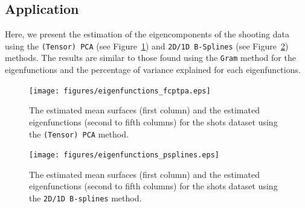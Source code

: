 
\subsection{Application} %
\label{sub:application}

Here, we present the estimation of the eigencomponents of the shooting data using the \texttt{(Tensor) PCA} (see Figure~\ref{fig:eigenfunctions_fcptpa}) and \texttt{2D/1D B-Splines} (see Figure~\ref{fig:eigenfunctions_psplines}) methods. The results are similar to those found using the \texttt{Gram} method for the eigenfunctions and the percentage of variance explained for each eigenfunctions.

\begin{figure}
    \centering
    \texttt{[image: figures/eigenfunctions\_fcptpa.eps]}
    \caption{The estimated mean surfaces (first column) and the estimated eigenfunctions (second to fifth columns) for the shots dataset using the \texttt{(Tensor) PCA} method.}
    \label{fig:eigenfunctions_fcptpa}
\end{figure}

\begin{figure}
    \centering
    \texttt{[image: figures/eigenfunctions\_psplines.eps]}
    \caption{The estimated mean surfaces (first column) and the estimated eigenfunctions (second to fifth columns) for the shots dataset using the \texttt{2D/1D B-splines} method.}
    \label{fig:eigenfunctions_psplines}
\end{figure}


